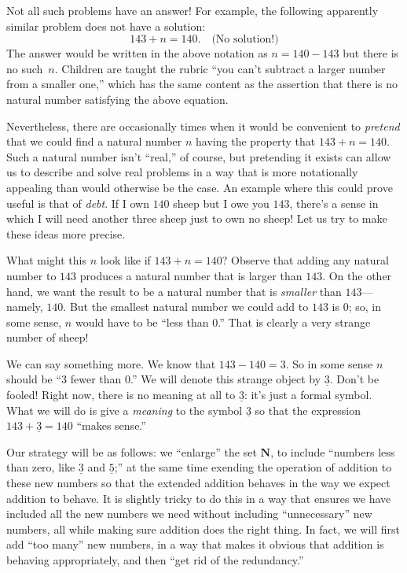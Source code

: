 \documentclass[10pt, a4paper, twocolumn]{article}
\newcommand{\set}[1]{\mathbold{#1}}
\newcommand{\N}{\set{N}}
\newcommand{\minus}[1]{\underline{#1}}
\begin{document}
Not all such problems have an answer! For example, the following
apparently similar problem does not have a solution:
\begin{equation*}
143 + n = 140. \quad\text{(No solution!)}
\end{equation*}
The answer would be written in the above notation as $n=140-143$ but there
is no such~$n$. Children are taught the rubric ``you can't
subtract a larger number from a smaller one,'' which has the same
content as the assertion that there is no natural number satisfying
the above equation.

Nevertheless, there are occasionally times when it would be convenient
to \emph{pretend} that we could find a natural number $n$ having the
property that $143+n=140$. Such a natural number isn't ``real,'' of
course, but pretending it exists can allow us to describe and solve
real problems in a way that is more notationally appealing than would
otherwise be the case. An example where this could prove useful is
that of \emph{debt}. If I own $140$ sheep but I owe you $143$, there's
a sense in which I will need another three sheep just to own no sheep!
Let us try to make these ideas more precise.

What might this $n$ look like if $143+n=140$? Observe that adding any natural
number to $143$ produces a natural number that is larger than
$143$. On the other hand, we want the result to be a natural number
that is \emph{smaller} than $143$---namely, $140$. But the smallest
natural number we could add to $143$ is $0$; so, in some sense, $n$
would have to be ``less than $0$.'' That is clearly a very strange
number of sheep!

We can say something more. We know that $143-140=3$. So in some sense
$n$ should be ``$3$ fewer than $0$.'' We will denote this strange
object by $\minus{3}$. Don't be fooled! Right now, there is no meaning
at all to $\minus{3}$: it's just a formal symbol. What we will do is
give a \emph{meaning} to the symbol $\minus{3}$ so that the expression
$143 + \minus{3} = 140$ ``makes sense.''

Our strategy will be as follows: we ``enlarge'' the set $\N$, to
include ``numbers less than zero, like $\minus{3}$ and $\minus{5}$;''
at the same time exending the operation of addition to these new
numbers so that the extended addition behaves in the way we expect
addition to behave. It is slightly tricky to do this in a way that
ensures we have included all the new numbers we need without
including ``unnecessary'' new numbers, all while making sure addition
does the right thing. In fact, we will first add ``too many'' new
numbers, in a way that makes it obvious that addition is behaving
appropriately, and then ``get rid of the redundancy.''
\end{document}
